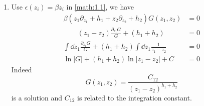 \begin{enumerate}
	\item Use $\epsilon(z_i) = \beta z_i $ in \eqref{math:1.1}, we have
		\begin{align*}
			\beta \left(  z_1 \partial_{z_1} + h_1  +  z_2 \partial_{z_2} + h_2 \right) G(z_1, z_2) &= 0 \\
			 \qquad \left( z_1 - z_2 \right) \frac{\partial_{z_1}G}{G} + (h_1 + h_2)  &= 0 \\
			 \int \dd{z_1} \frac{\partial_{z_1} G}{G} + (h_1 + h_2) \int \dd{z_1} \frac{1}{z_1 - z_2}&=  0 \\
			 \ln |G| + (h_1 + h_2) \ln|z_1 - z_2| + C &= 0
		\end{align*}
		Indeed 
		\begin{equation}
			G(z_1, z_2) = \frac{C_{12}}{(z_1 - z_2)^{h_1 + h_2}}
			\label{math:G12}
		\end{equation}
		is a solution and $C_{12}$ is related to the integration constant.


\end{enumerate}
